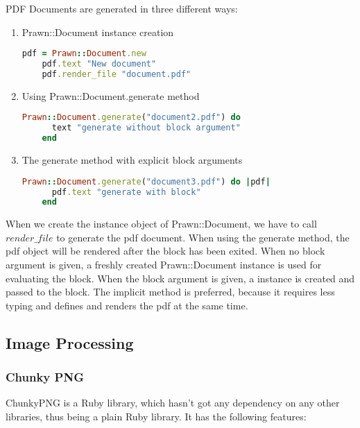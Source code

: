 PDF Documents are generated in three different ways:
\begin{enumerate}
  \item Prawn::Document instance creation
    \begin{lstlisting}[language=Ruby, caption={Prawn Document generation with instance creation}, label=ruby_prawn1]
    pdf = Prawn::Document.new
    pdf.text "New document"
    pdf.render_file "document.pdf"
    \end{lstlisting}

  \item Using Prawn::Document.generate method
    \begin{lstlisting}[language=Ruby, caption={Prawn Document generation with method}, label=ruby_prawn2]
    Prawn::Document.generate("document2.pdf") do 
      text "generate without block argument"
    end
    \end{lstlisting}

  \item The generate method with explicit block arguments
    \begin{lstlisting}[language=Ruby, caption={Prawn Document generation with block argument}, label=ruby_prawn3]
    Prawn::Document.generate("document3.pdf") do |pdf|
      pdf.text "generate with block"
    end
    \end{lstlisting}
\end{enumerate}

When we create the instance object of Prawn::Document, we have to call $render\_file$ to generate the pdf document. 
When using the generate method, the pdf object will be rendered after the block has been exited. When no block argument is given, a freshly created Prawn::Document instance is used for evaluating the block. When the block argument is given, a instance is created and passed to the block. The implicit method is preferred, because it requires less typing and defines and renders the pdf at the same time. 


\subsection{Image Processing}

\subsubsection{Chunky PNG}

ChunkyPNG is a Ruby library, which hasn't got any dependency on any other libraries, thus being a plain Ruby library.
It has the following features:

